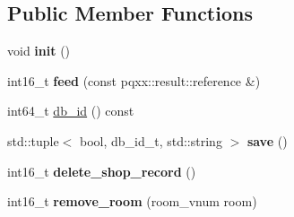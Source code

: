 \subsection*{Public Member Functions}
\begin{DoxyCompactItemize}
\item 
\mbox{\label{structmods_1_1orm_1_1shop_af6942b864fd5faa45db52fc9955ba5d9}} 
void {\bfseries init} ()
\item 
\mbox{\label{structmods_1_1orm_1_1shop_a1645fa83ebf694d5bd6a247becec5538}} 
int16\+\_\+t {\bfseries feed} (const pqxx\+::result\+::reference \&)
\item 
int64\+\_\+t \hyperlink{structmods_1_1orm_1_1shop_a696c01543bff9b376b37136834c5c285}{db\+\_\+id} () const
\item 
\mbox{\label{structmods_1_1orm_1_1shop_a0fa7c25ff8e6a40c6edfc48abcde585d}} 
std\+::tuple$<$ bool, db\+\_\+id\+\_\+t, std\+::string $>$ {\bfseries save} ()
\item 
\mbox{\label{structmods_1_1orm_1_1shop_aacd3c43225153cc554b8287cbe39477e}} 
int16\+\_\+t {\bfseries delete\+\_\+shop\+\_\+record} ()
\item 
\mbox{\label{structmods_1_1orm_1_1shop_a1f2b7f07775f3fb3a24aba853eeacb26}} 
int16\+\_\+t {\bfseries remove\+\_\+room} (room\+\_\+vnum room)
\end{DoxyCompactItemize}
